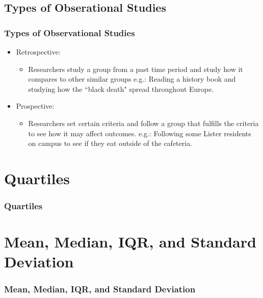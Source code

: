 \documentclass{beamer}
\begin{document}
    \subsection{Types of Obserational Studies}

    \begin{frame}
        \frametitle{Types of Observational Studies}
        \begin{itemize}
            \item Retrospective:
            \begin{itemize}
                \item[] Researchers study a group from a past time period and study how it compares
                to other similar groups \newline
                e.g.: Reading a history book and studying how the ``black death" spread throughout 
                Europe. \newline \pause
            \end{itemize}
            \item Prospective:
            \begin{itemize}
                \item[] Researchers set certain criteria and follow a group that fulfills the criteria
                 to see how it may affect outcomes.\newline
                e.g.: Following some Lister residents on campus to see if they eat outside of the cafeteria.
            \end{itemize}
        \end{itemize}
    \end{frame}

    \section{Quartiles}

    \begin{frame}
        \frametitle{Quartiles}

    \end{frame}

    \section{Mean, Median, IQR, and Standard Deviation}
    
    \begin{frame}
        \frametitle{Mean, Median, IQR, and Standard Deviation}
    \end{frame}
\end{document}
